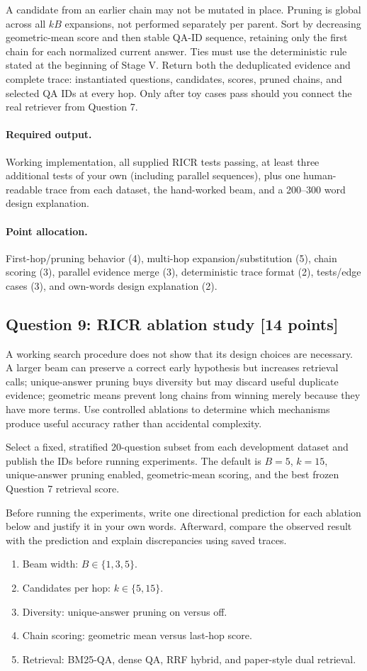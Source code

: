 \documentclass[11pt]{article}
\newcommand{\RICR}{{\mdseries\textsc{RICR}}\xspace}
\newcommand{\question}[3]{%
  \subsection[Question #1: #2 (#3 points)]{Question #1: #2 \hfill [#3 points]}%
}
\newcommand{\deliverables}{\paragraph{Required output.}}
\newcommand{\grading}{\paragraph{Point allocation.}}
\begin{document}
A candidate from an earlier chain may not be mutated in place. Pruning is
global across all $kB$ expansions, not performed separately per parent. Sort by
decreasing geometric-mean score and then stable QA-ID sequence, retaining only
the first chain for each normalized current answer. Ties must use the
deterministic rule stated at the beginning of Stage V. Return both the
deduplicated evidence and complete trace: instantiated questions, candidates,
scores, pruned chains, and selected QA IDs at every hop. Only after toy cases
pass should you connect the real retriever from Question 7.

\deliverables Working implementation, all supplied \RICR tests passing, at
least three additional tests of your own (including parallel sequences), plus
one human-readable trace from each dataset, the hand-worked beam, and a
200--300 word design explanation.

\grading First-hop/pruning behavior (4), multi-hop expansion/substitution (5),
chain scoring (3), parallel evidence merge (3), deterministic trace format
(2), tests/edge cases (3), and own-words design explanation (2).

\question{9}{\RICR ablation study}{14}

A working search procedure does not show that its design choices are
necessary. A larger beam can preserve a correct early hypothesis but increases
retrieval calls; unique-answer pruning buys diversity but may discard useful
duplicate evidence; geometric means prevent long chains from winning merely
because they have more terms. Use controlled ablations to determine which
mechanisms produce useful accuracy rather than accidental complexity.

Select a fixed, stratified 20-question subset from each development dataset
and publish the IDs before running experiments. The default is $B=5$, $k=15$,
unique-answer pruning enabled, geometric-mean scoring, and the best frozen
Question 7 retrieval score.

Before running the experiments, write one directional prediction for each
ablation below and justify it in your own words. Afterward, compare the
observed result with the prediction and explain discrepancies using saved
traces.

\begin{enumerate}[label=(\alph*)]
  \item Beam width: $B\in\{1,3,5\}$.
  \item Candidates per hop: $k\in\{5,15\}$.
  \item Diversity: unique-answer pruning on versus off.
  \item Chain scoring: geometric mean versus last-hop score.
  \item Retrieval: BM25-QA, dense QA, RRF hybrid, and paper-style dual
        retrieval.
\end{enumerate}
\end{document}
